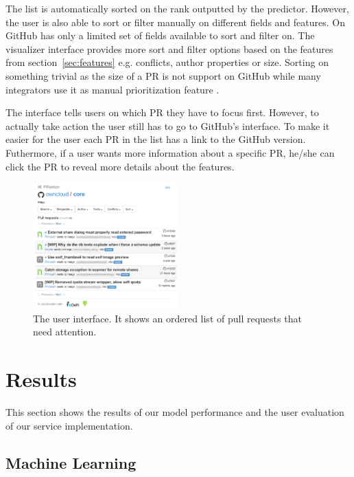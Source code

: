 \documentclass[conference]{IEEEtran}
\begin{document}
The list is automatically sorted on the rank outputted by the predictor.
However, the user is also able to sort or filter manually on different fields and features.
On GitHub has only a limited set of fields available to sort and filter on.
The visualizer interface provides more sort and filter options based on the features from section~\ref{sec:features} e.g. conflicts, author properties or size.
Sorting on something trivial as the size of a PR is not support on GitHub while many integrators use it as manual prioritization feature \cite{GZSD15}.

The interface tells users on which PR they have to focus first.
However, to actually take action the user still has to go to GitHub's interface.
To make it easier for the user each PR in the list has a link to the GitHub version.
Futhermore, if a user wants more information about a specific PR, he/she can click the PR to reveal more details about the features.

\begin{figure}
  \centering
  \includegraphics[width=0.5\textwidth]{../figs/interface.pdf}
  \caption[The user interface]
   {The user interface. It shows an ordered list of pull requests that need attention.}
  \label{fig:ui}
\end{figure}

\section{Results}

\label{sec:results}

This section shows the results of our model performance and the user evaluation of our service implementation.

\subsection{Machine Learning}
\label{sec:learning}
\end{document}

